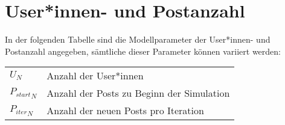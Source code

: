 

\section{User*innen- und Postanzahl}

In der folgenden Tabelle sind die Modellparameter der User*innen- und Postanzahl angegeben, sämtliche dieser Parameter können variiert werden:

\begin{table}[!htbp]
	\begin{tabularx}{\textwidth}{lX}
		$U_N$&  Anzahl der User*innen\\
		${P_{start}}_{N}$ & Anzahl der Posts zu Beginn der Simulation \\
		${P_{iter}}_{N}$ & Anzahl der neuen Posts pro Iteration\\ 
	\end{tabularx}
\end{table}
